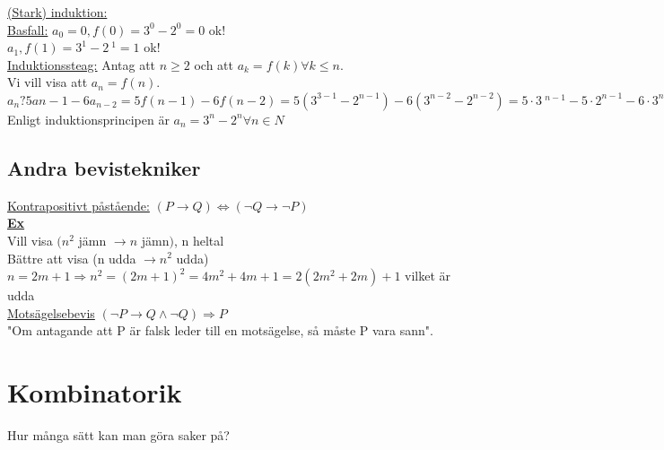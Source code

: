 \documentclass{article}
\begin{document}
            \underline{(Stark) induktion:}\\
            \indent \underline{Basfall:} $a_{0}=0, f(0)=3^{0}-2^{0}=0$ ok!\\
            \indent $a_{1}, f(1)=3^{1}-2~^{1}=1$ ok!\\
            \indent \underline{Induktionssteag:} Antag att $n\geq 2$ och att $a_{k}=f(k) \forall k\le n$.\\
            \indent Vi vill visa att $a_{n}=f(n)$.\\
            \indent $a_{n}?5a{n-1}-6a_{n-2}=5f(n-1)-6f(n-2)=5(3^{3-1}-2^{n-1})-6(3^{n-2}-2^{n-2})=
                    5\cdot 3~^{n-1}-5\cdot 2^{n-1}-6\cdot 3^{n-2}+6\cdot 2^{n-2}=5\cdot 3^{n-1}-6\cdot 3^{n-2}-5\cdot 2^{n-1}+6\cdot 2{n-2}=
                    3^{n-2}(15-6)-2^{n-2}(10-6)=3^{n}-2^{n}=f(n)$\\
            \indent Enligt induktionsprincipen är $a_{n}=3^{n}-2^{n} \forall n\in N$\\
        \subsection{Andra bevistekniker}
            \underline{Kontrapositivt påstående:} $(P\rightarrow Q)\Leftrightarrow (\lnot Q\rightarrow \lnot P)$\\
            \underline{\textbf{Ex}}\\
            \indent Vill visa $(n^{2}$ jämn $\rightarrow n$ jämn$)$, n heltal\\
            \indent Bättre att visa (n udda $\rightarrow n^{2}$ udda)
            \indent $n=2m+1\Rightarrow n^{2}=(2m+1)^{2}=4m^{2}+4m+1=2(2m^{2}+2m)+1$ vilket är udda\\
            \underline{Motsägelsebevis} $(\lnot P\rightarrow Q\wedge \lnot Q)\Rightarrow P$\\
            "Om antagande att P är falsk leder till en motsägelse, så måste P vara sann".
    \section{Kombinatorik}
    Hur många sätt kan man göra saker på?\\
\end{document}
